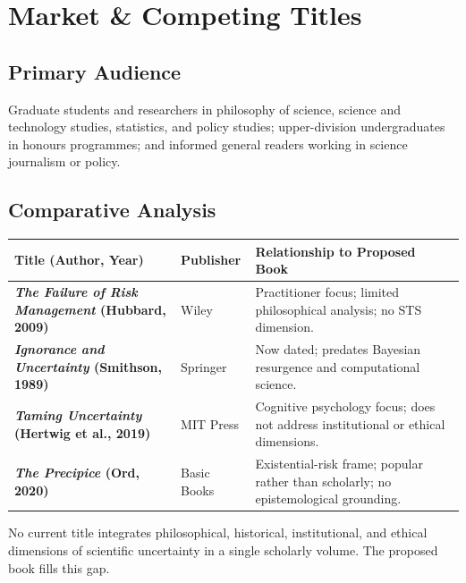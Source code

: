 \section{Market \& Competing Titles}

\subsection*{Primary Audience}
Graduate students and researchers in philosophy of science, science and technology studies, statistics, and policy studies; upper-division undergraduates in honours programmes; and informed general readers working in science journalism or policy.

\subsection*{Comparative Analysis}

\renewcommand{\arraystretch}{1.25}
\begin{tabularx}{\linewidth}{@{}
  >{\bfseries}p{38mm}
  >{\raggedright\arraybackslash}p{32mm}
  >{\raggedright\arraybackslash}X
@{}}
\toprule
\rowcolor{lightbg}
\normalfont\bfseries Title (Author, Year) & Publisher & Relationship to Proposed Book \\
\midrule
\textit{The Failure of Risk Management} (Hubbard, 2009)
  & Wiley
  & Practitioner focus; limited philosophical analysis; no STS dimension.\\
\textit{Ignorance and Uncertainty} (Smithson, 1989)
  & Springer
  & Now dated; predates Bayesian resurgence and computational science.\\
\textit{Taming Uncertainty} (Hertwig et al., 2019)
  & MIT Press
  & Cognitive psychology focus; does not address institutional or ethical dimensions.\\
\textit{The Precipice} (Ord, 2020)
  & Basic Books
  & Existential-risk frame; popular rather than scholarly; no epistemological grounding.\\
\bottomrule
\end{tabularx}

\smallskip
{\small No current title integrates philosophical, historical, institutional, and ethical dimensions of scientific uncertainty in a single scholarly volume. The proposed book fills this gap.}


